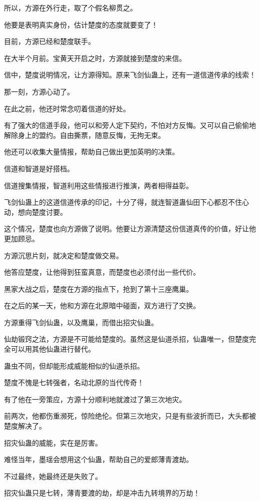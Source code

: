 \begin{this_body}
所以，方源在外行走，取了个假名柳贯之。

他要是表明真实身份，估计楚度的态度就要变了！

目前，方源已经和楚度联手。

在大半个月前。宝黄天开启之时，方源就接到楚度的来信。

信中，楚度说明情况，让方源得知。原来飞剑仙蛊上，还有一道信道传承的线索！

那一刻，方源心动了。

在此之前，他还时常念叨着信道的好处。

有了强大的信道手段，他可以和旁人定下契约，不怕对方反悔。又可以自己偷偷地解除身上的盟约。自由撕票，随意反悔，无拘无束。

他还可以收集大量情报，帮助自己做出更加英明的决策。

信道和智道是好搭档。

信道搜集情报，智道利用这些情报进行推演，两者相得益彰。

飞剑仙蛊上的这道信道传承的印记，十分了得，就连智道蛊仙田下心都忍不住心动，想向楚度讨要。

这个情况，楚度也向方源做了说明。他要让方源清楚这份信道真传的价值，好让他更加顾忌。

方源沉思片刻，就决定和楚度做交易。

他答应楚度，让他得到狂蛮真意，而楚度也必须付出一些代价。

黑家大战之后，楚度在方源的指点下，抢到了第十三座鹰巢。

在之后的某一天，他和方源在北原暗中碰面，双方进行了交换。

方源重得飞剑仙蛊，以及鹰巢，而借出招灾仙蛊。

仙劫锻窍之法，方源是不可能给楚度的。虽然这是仙道杀招，仙蛊唯一，但楚度完全可以用其他仙蛊进行替代。

蛊虫不同，但却能形成威能相似的仙道杀招。

楚度不愧是七转强者，名动北原的当代传奇！

有了他在一旁策应，方源十分顺利地就渡过了第三次地灾。

前两次，他都伤重濒死，惊险绝伦。但第三次地灾，只是有些波折而已，大头都被楚度解决了。

招灾仙蛊的威能，实在是厉害。

难怪当年，墨瑶会想用这个仙蛊，帮助自己的爱郎薄青渡劫。

不过最终，她最终还是失败了。

招灾仙蛊只是七转，薄青要渡的劫，却是冲击九转境界的万劫！


\end{this_body}
